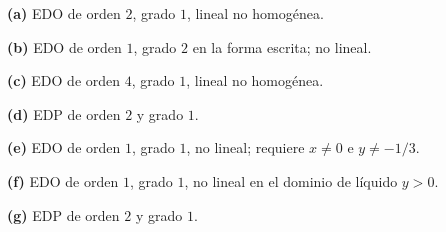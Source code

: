 \noindent\textbf{(a)} EDO de orden $2$, grado $1$, lineal no homogénea.

\noindent\textbf{(b)} EDO de orden $1$, grado $2$ en la forma escrita; no lineal.

\noindent\textbf{(c)} EDO de orden $4$, grado $1$, lineal no homogénea.

\noindent\textbf{(d)} EDP de orden $2$ y grado $1$.

\noindent\textbf{(e)} EDO de orden $1$, grado $1$, no lineal; requiere $x\ne0$ e $y\ne-1/3$.

\noindent\textbf{(f)} EDO de orden $1$, grado $1$, no lineal en el dominio de líquido $y>0$.

\noindent\textbf{(g)} EDP de orden $2$ y grado $1$.
